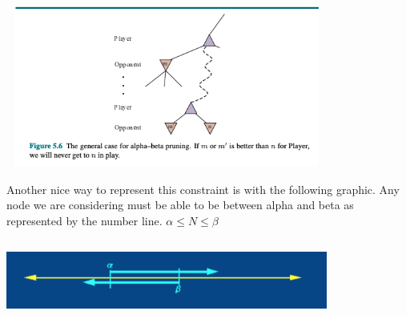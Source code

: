 \includegraphics[width=400px,height=200px]{images/AI_figure_5_6.png}

Another nice way to represent this constraint is with the following graphic. Any node we are considering must be able to be between alpha and beta as represented by the number line. $ \alpha \leq N \leq \beta $

\includegraphics[width=400px,height=100px]{images/alpha_beta_number_line.png}



